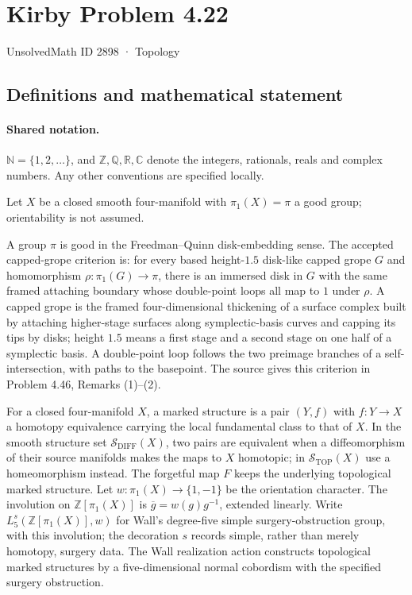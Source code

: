 \documentclass[11pt]{article}
\begin{document}
\setcounter{section}{2897}
\section{Kirby Problem 4.22}\label{2898}
{\small\sffamily UnsolvedMath ID 2898 · Topology}
\subsection{Definitions and mathematical statement}

\paragraph{Shared notation.}$\mathbb N=\{1,2,\ldots\}$, and $\mathbb Z,\mathbb Q,\mathbb R,\mathbb C$ denote the integers, rationals, reals and complex numbers. Any other conventions are specified locally.


Let $X$ be a closed smooth four-manifold with $\pi_1(X)=\pi$ a good group; orientability is not assumed.

A group $\pi$ is good in the Freedman--Quinn disk-embedding sense. The accepted capped-grope criterion is: for every based height-$1.5$ disk-like capped grope $G$ and homomorphism $\rho:\pi_1(G)\to\pi$, there is an immersed disk in $G$ with the same framed attaching boundary whose double-point loops all map to $1$ under $\rho$. A capped grope is the framed four-dimensional thickening of a surface complex built by attaching higher-stage surfaces along symplectic-basis curves and capping its tips by disks; height $1.5$ means a first stage and a second stage on one half of a symplectic basis. A double-point loop follows the two preimage branches of a self-intersection, with paths to the basepoint. The source gives this criterion in Problem 4.46, Remarks (1)--(2).

For a closed four-manifold $X$, a marked structure is a pair $(Y,f)$ with $f:Y\to X$ a homotopy equivalence carrying the local fundamental class to that of $X$. In the smooth structure set $\mathcal S_{\mathrm{DIFF}}(X)$, two pairs are equivalent when a diffeomorphism of their source manifolds makes the maps to $X$ homotopic; in $\mathcal S_{\mathrm{TOP}}(X)$ use a homeomorphism instead. The forgetful map $F$ keeps the underlying topological marked structure. Let $w:\pi_1(X)\to\{1,-1\}$ be the orientation character. The involution on $\mathbb Z[\pi_1(X)]$ is $\overline g=w(g)g^{-1}$, extended linearly. Write $L_5^s(\mathbb Z[\pi_1(X)],w)$ for Wall's degree-five simple surgery-obstruction group, with this involution; the decoration $s$ records simple, rather than merely homotopy, surgery data. The Wall realization action constructs topological marked structures by a five-dimensional normal cobordism with the specified surgery obstruction.
\end{document}
